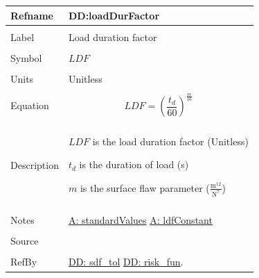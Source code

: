 \documentclass[12pt]{article}
\begin{document}
\noindent \begin{minipage}{\textwidth}
\begin{tabular}{p{} p{}}
\toprule \textbf{Refname} & \textbf{DD:loadDurFactor}
\label{DD:loadDurFactor}
\\ \midrule \\
Label & Load duration factor
\\ \midrule \\
Symbol & $LDF$
\\ \midrule \\
Units & Unitless
\\ \midrule \\
Equation & \begin{displaymath}
           LDF=\left(\frac{{t_{d}}}{60}\right)^{\frac{m}{16}}
           \end{displaymath}
\\ \midrule \\
Description & \begin{symbDescription}
              \item{$LDF$ is the load duration factor (Unitless)}
              \item{${t_{d}}$ is the duration of load (s)}
              \item{$m$ is the surface flaw parameter ($\frac{\text{m}^{12}}{\text{N}^{7}}$)}
              \end{symbDescription}
\\ \midrule \\
Notes & \hyperref[assumpSV]{A: standardValues}
        \hyperref[assumpLDFC]{A: ldfConstant}
\\ \midrule \\
Source & \cite{astm2009}
\\ \midrule \\
RefBy & \hyperref[DD:sdf.tol]{DD: sdf\_tol} \hyperref[DD:risk.fun]{DD: risk\_fun}.
\\ \bottomrule \end{tabular}
\end{minipage}
\par~
\end{document}
